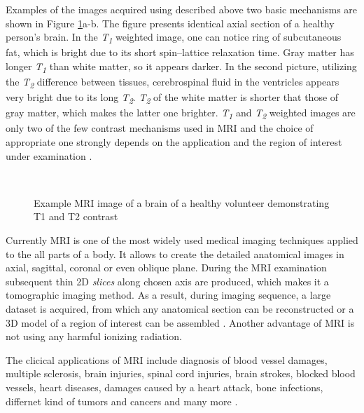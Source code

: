 Examples of the images acquired using described above two basic mechanisms are shown in Figure \ref{fig:t1t2}a-b. 
The figure presents identical axial section of a healthy person's brain. In the \textit{T\textsubscript{1}} weighted  image, one can notice ring of subcutaneous fat, which is bright due to its short spin–lattice relaxation time. Gray matter has longer \textit{T\textsubscript{1}} than white matter, so it appears darker. In the second picture, utilizing the \textit{T\textsubscript{2}} difference between tissues, cerebrospinal fluid in the ventricles appears very bright due to its long  \textit{T\textsubscript{2}}. \textit{T\textsubscript{2}} of the white matter is shorter that those of gray matter, which makes the latter one brighter. \textit{T\textsubscript{1}} and \textit{T\textsubscript{2}} weighted images are only two of the few contrast mechanisms used in  MRI and the choice of appropriate one strongly depends on the application and the region of interest under examination \cite{biomedical_hanbook_imaging}.

 
\begin{figure}

\captionsetup[subfloat]{captionskip=0.5cm}
	\centering
	\hspace{1.5cm}
	\\	
\vspace{0.5cm}
\caption[Comparison of \textit{T\textsubscript{1}}- and \textit{T\textsubscript{2}}-weighted images]{Example MRI image of a brain of a healthy volunteer demonstrating T1 and T2 contrast \cite{t1t2brain}}
\label{fig:t1t2}
\end{figure}

Currently MRI is one of the most widely used medical imaging techniques applied to the all parts of a body. It allows to create the detailed anatomical images in axial, sagittal, coronal or even oblique plane. During the MRI examination subsequent thin 2D \textit{slices} along chosen axis are produced, which makes it a tomographic imaging method. As a result, during imaging sequence, a large dataset is acquired, from which any anatomical section can be reconstructed or a 3D model of a region of interest can be assembled \cite {bushong2014magnetic}. Another advantage of MRI is not using any harmful ionizing radiation.

The clicical applications of MRI include diagnosis of blood vessel damages, multiple sclerosis, brain injuries, spinal cord injuries, brain strokes, blocked blood vessels, heart diseases, damages caused by a heart attack, bone infections, differnet kind of tumors and cancers and many more \cite{mriApplications}.

